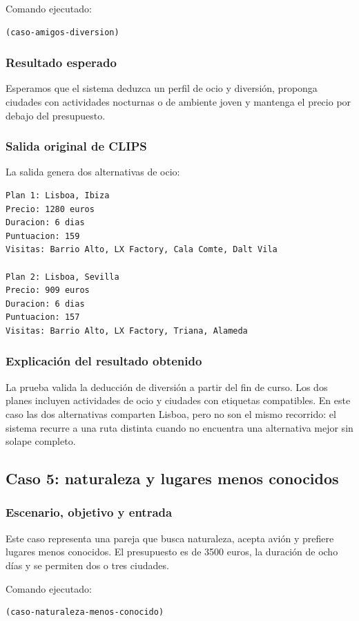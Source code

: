 \documentclass[11pt,a4paper]{article}
\begin{document}
Comando ejecutado:
\begin{verbatim}
(caso-amigos-diversion)
\end{verbatim}

\subsubsection{Resultado esperado}
Esperamos que el sistema deduzca un perfil de ocio y diversi\'on, proponga
ciudades con actividades nocturnas o de ambiente joven y mantenga el precio por
debajo del presupuesto.

\subsubsection{Salida original de CLIPS}
La salida genera dos alternativas de ocio:
\begin{verbatim}
Plan 1: Lisboa, Ibiza
Precio: 1280 euros
Duracion: 6 dias
Puntuacion: 159
Visitas: Barrio Alto, LX Factory, Cala Comte, Dalt Vila

Plan 2: Lisboa, Sevilla
Precio: 909 euros
Duracion: 6 dias
Puntuacion: 157
Visitas: Barrio Alto, LX Factory, Triana, Alameda
\end{verbatim}

\subsubsection{Explicaci\'on del resultado obtenido}
La prueba valida la deducci\'on de diversi\'on a partir del fin de curso. Los dos
planes incluyen actividades de ocio y ciudades con etiquetas compatibles. En
este caso las dos alternativas comparten Lisboa, pero no son el mismo recorrido:
el sistema recurre a una ruta distinta cuando no encuentra una alternativa
mejor sin solape completo.

\subsection{Caso 5: naturaleza y lugares menos conocidos}
\subsubsection{Escenario, objetivo y entrada}
Este caso representa una pareja que busca naturaleza, acepta avi\'on y prefiere
lugares menos conocidos. El presupuesto es de 3500 euros, la duraci\'on de ocho
d\'ias y se permiten dos o tres ciudades.

Comando ejecutado:
\begin{verbatim}
(caso-naturaleza-menos-conocido)
\end{verbatim}
\end{document}
